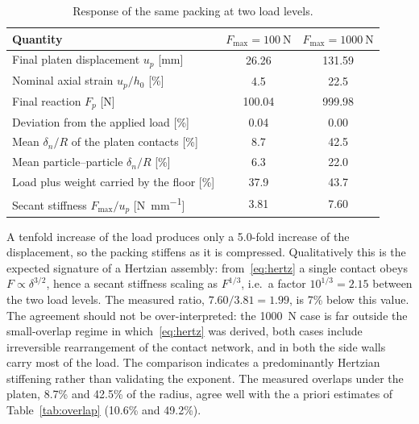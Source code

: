 \begin{table}[htbp]
  \centering
  \caption{Response of the same packing at two load levels.}
  \label{tab:loadlevels}
  \begin{tabular}{lS[table-format=3.2]S[table-format=3.2]}
    \toprule
    Quantity & {$F_{\max}=\qty{100}{\newton}$} & {$F_{\max}=\qty{1000}{\newton}$} \\
    \midrule
    Final platen displacement $u_{p}$ [\unit{\milli\metre}] & 26.26 & 131.59 \\
    Nominal axial strain $u_{p}/h_{0}$ [\%]                 &  4.5  &  22.5 \\
    Final reaction $F_{p}$ [\unit{\newton}]                 & 100.04 & 999.98 \\
    Deviation from the applied load [\%]                    &  0.04 &  0.00 \\
    Mean $\delta_{n}/R$ of the platen contacts [\%]         &  8.7  &  42.5 \\
    Mean particle--particle $\delta_{n}/R$ [\%]             &  6.3  &  22.0 \\
    Load plus weight carried by the floor [\%]              & 37.9  &  43.7 \\
    Secant stiffness $F_{\max}/u_{p}$ [\unit{\newton\per\milli\metre}] & 3.81 & 7.60 \\
    \bottomrule
  \end{tabular}
\end{table}

A tenfold increase of the load produces only a \num{5.0}-fold increase of the
displacement, so the packing stiffens as it is compressed.  Qualitatively this
is the expected signature of a Hertzian assembly: from~\eqref{eq:hertz} a single
contact obeys $F\propto\delta^{3/2}$, hence a secant stiffness scaling as
$F^{1/3}$, i.e.\ a factor $10^{1/3}=\num{2.15}$ between the two load levels.
The measured ratio, $7.60/3.81=\num{1.99}$, is \num{7}\% below this value.  The
agreement should not be over-interpreted: the \qty{1000}{\newton} case is far
outside the small-overlap regime in which~\eqref{eq:hertz} was derived, both
cases include irreversible rearrangement of the contact network, and in both the
side walls carry most of the load.  The comparison indicates a predominantly
Hertzian stiffening rather than validating the exponent.  The measured overlaps
under the platen, \num{8.7}\% and \num{42.5}\% of the radius, agree well with
the a priori estimates of Table~\ref{tab:overlap} (\num{10.6}\% and
\num{49.2}\%).

